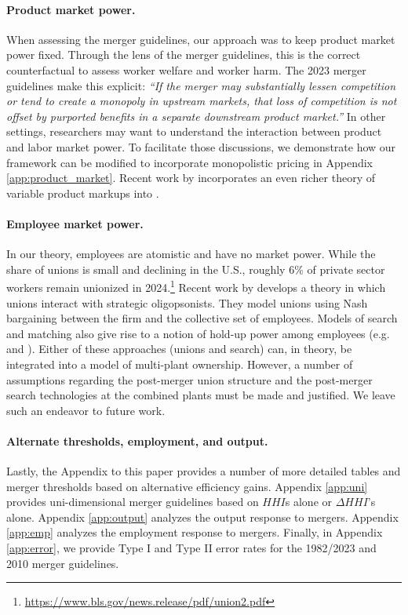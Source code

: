 \documentclass[12pt]{article}
\theoremstyle{prop}
\begin{document}
\paragraph{Product market power.}  
When assessing the merger guidelines, our approach was to keep product market power fixed. 
Through the lens of the merger guidelines, this is the correct counterfactual to assess worker welfare and worker harm. The 2023 merger guidelines make this explicit: 
\emph{``If the merger may substantially lessen competition or tend to create a monopoly in upstream
		markets, that loss of competition is not offset by purported benefits in a separate downstream product
		market.''}
In other settings, researchers may want to understand the interaction between product and labor market power. 
To facilitate those discussions, we demonstrate how our  framework can be modified to incorporate monopolistic pricing  in Appendix \ref{app:product_market}.
Recent work by \citet{deb2022drives} incorporates an even richer theory of variable product markups into  \citet{berger2022labor}.

\paragraph{Employee market power.}   In our theory, employees are atomistic and have no market power. 
While the share of unions is small and declining in the U.S., roughly 6\% of private sector workers remain unionized in 2024.\footnote{\url{https://www.bls.gov/news.release/pdf/union2.pdf} }
	Recent work by \citet{azkarate2020aggregate} develops a theory in which unions interact with strategic oligopsonists. 
They model unions using Nash bargaining between the firm and the collective set of employees. 
Models of search and matching also give rise to a notion of hold-up power among employees (e.g. \citet{bagga2023firm} and \citet{berger2023anatomy}).
Either of these approaches (unions and search) can, in theory, be integrated into a model of multi-plant ownership.
However, a number of assumptions regarding the post-merger union structure and the  post-merger search technologies at the combined plants must be made and justified.  
We leave such an endeavor to future work. 
 
\paragraph{Alternate thresholds, employment, and output.} 
Lastly, the Appendix to this paper provides a number of more detailed tables and merger thresholds based on alternative efficiency gains.
Appendix \ref{app:uni} provides uni-dimensional merger guidelines based on $HHI$s alone or $\Delta HHI$'s alone. 
Appendix \ref{app:output} analyzes the output response to mergers. 
Appendix \ref{app:emp} analyzes the employment response to mergers. 
Finally, in Appendix \ref{app:error}, we provide Type I and Type II error rates for the 1982/2023 and 2010 merger guidelines.
 
\end{document}
